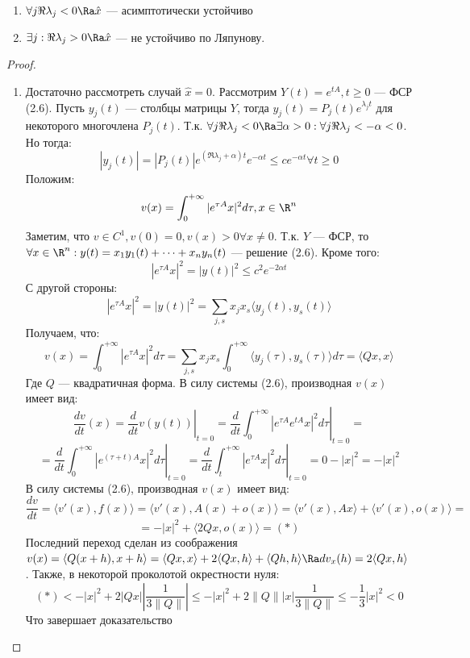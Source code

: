 \begin{theorem}
    \begin{enumerate}
        \item \(\forall j \Re \lambda_j < 0 \Ra \hat{x}\) --- асимптотически устойчиво
        \item \(\exists j: \Re \lambda_j > 0 \Ra \hat{x}\) --- не устойчиво по Ляпунову.
    \end{enumerate}
\end{theorem}
\begin{proof}
    \begin{enumerate}
        \item Достаточно рассмотреть случай \(\hat{x} = 0\). Рассмотрим \(Y(t) = e^{tA}, t \ge 0\) --- ФСР (2.6). Пусть \(y_j(t)\) --- столбцы матрицы \(Y\), тогда \(y_j(t) = P_j(t)e^{\lambda_j t}\) для некоторого многочлена \(P_j(t)\). Т.к. \(\forall j \Re \lambda_j < 0  \Ra \exists \alpha > 0: \forall j \Re \lambda_j < -\alpha < 0\). Но тогда:
        \[|y_j(t)| = |P_j(t)|e^{(\Re \lambda_j + \alpha)t}e^{-\alpha t} \le ce^{-\alpha t} \forall t \ge 0\]
        Положим:
        \[v(x) = \int_0^{+\infty}|e^{\tau A} x|^2 d\tau, x \in \R^n\]
        Заметим, что \(v \in C^1, v(0) = 0, v(x) > 0 \forall x \ne 0\).
        Т.к. \(Y\) --- ФСР, то \(\forall x \in \R^n: y(t) = x_1y_1(t) + \dots + x_ny_n(t)\) --- решение (2.6). Кроме того:
        \[|e^{\tau A} x|^2 = |y(t)|^2 \le c^2e^{-2\alpha t}\]
        С другой стороны:
        \[|e^{\tau A} x|^2 = |y(t)|^2 = \sum_{j, s}x_jx_s\langle y_j(t), y_s(t) \rangle\]
        Получаем, что:
        \[v(x) = \int_0^{+\infty} |e^{\tau A} x|^2 d\tau = \sum_{j, s}x_jx_s \int_0^{+\infty} \langle y_j(\tau), y_s(\tau) \rangle d\tau = \langle Qx, x \rangle\]
        Где \(Q\) --- квадратичная форма. В силу системы (2.6), производная \(v(x)\) имеет вид:
        \[\frac{dv}{dt}(x) = \left.\frac{d}{dt}v(y(t))\right|_{t = 0} = \left.\frac{d}{dt}\int_0^{+\infty} |e^{\tau A} e^{tA}x|^2d\tau\right|_{t = 0} = \]
        \[ = \left.\frac{d}{dt}\int_0^{+\infty} |e^{(\tau + t) A}x|^2d\tau\right|_{t = 0} = \left.\frac{d}{dt}\int_t^{+\infty} |e^{\tau A}x|^2d\tau\right|_{t = 0} = 0 - |x|^2 = -|x|^2\]
        В силу системы (2.6), производная \(v(x)\) имеет вид:
        \[\frac{dv}{dt} = \langle v'(x), f(x) \rangle = \langle v'(x), A(x) + o(x) \rangle = \langle v'(x), Ax \rangle + \langle v'(x), o(x) \rangle = \]
        \[= -|x|^2 + \langle 2Qx, o(x) \rangle = (*)\]
        Последний переход сделан из соображения \(v(x) = \langle Q(x + h), x + h \rangle = \langle Qx, x \rangle + 2\langle Qx, h \rangle + \langle Qh, h \rangle \Ra dv_x(h) = 2\langle Qx, h \rangle\). Также, в некоторой проколотой окрестности нуля:
        \[(*) < -|x|^2 + 2|Qx|\left| \frac{1}{3\|Q\|} \right|\le -|x|^2 + 2\|Q\||x| \frac{1}{3\|Q\|} \le -\frac{1}{3} |x|^2 < 0\]
        Что завершает доказательство
    \end{enumerate}
\end{proof}

